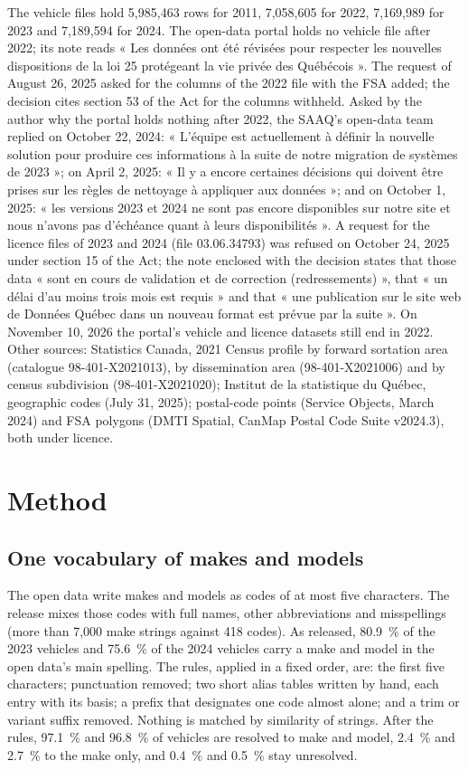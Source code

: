 \documentclass[10.5pt,a4paper]{article}
\begin{document}
The vehicle files hold 5{,}985{,}463 rows for 2011, 7{,}058{,}605 for 2022, 7{,}169{,}989 for 2023 and 7{,}189{,}594 for 2024. The open-data portal holds no vehicle file after 2022; its note reads « Les données ont été révisées pour respecter les nouvelles dispositions de la loi 25 protégeant la vie privée des Québécois ». The request of August 26, 2025 asked for the columns of the 2022 file with the FSA added; the decision cites section 53 of the Act for the columns withheld. Asked by the author why the portal holds nothing after 2022, the SAAQ's open-data team replied on October 22, 2024: « L'équipe est actuellement à définir la nouvelle solution pour produire ces informations à la suite de notre migration de systèmes de 2023 »; on April 2, 2025: « Il y a encore certaines décisions qui doivent être prises sur les règles de nettoyage à appliquer aux données »; and on October 1, 2025: « les versions 2023 et 2024 ne sont pas encore disponibles sur notre site et nous n'avons pas d'échéance quant à leurs disponibilités ». A request for the licence files of 2023 and 2024 (file 03.06.34793) was refused on October 24, 2025 under section 15 of the Act; the note enclosed with the decision states that those data « sont en cours de validation et de correction (redressements) », that « un délai d'au moins trois mois est requis » and that « une publication sur le site web de Données Québec dans un nouveau format est prévue par la suite ». On November 10, 2026 the portal's vehicle and licence datasets still end in 2022. Other sources: Statistics Canada, 2021 Census profile by forward sortation area (catalogue 98-401-X2021013), by dissemination area (98-401-X2021006) and by census subdivision (98-401-X2021020); Institut de la statistique du Québec, geographic codes (July 31, 2025); postal-code points (Service Objects, March 2024) and FSA polygons (DMTI Spatial, CanMap Postal Code Suite v2024.3), both under licence.

\section{Method}
\subsection{One vocabulary of makes and models}
The open data write makes and models as codes of at most five characters. The release mixes those codes with full names, other abbreviations and misspellings (more than 7{,}000 make strings against 418 codes). As released, 80.9~\% of the 2023 vehicles and 75.6~\% of the 2024 vehicles carry a make and model in the open data's main spelling. The rules, applied in a fixed order, are: the first five characters; punctuation removed; two short alias tables written by hand, each entry with its basis; a prefix that designates one code almost alone; and a trim or variant suffix removed. Nothing is matched by similarity of strings. After the rules, 97.1~\% and 96.8~\% of vehicles are resolved to make and model, 2.4~\% and 2.7~\% to the make only, and 0.4~\% and 0.5~\% stay unresolved.
\end{document}
